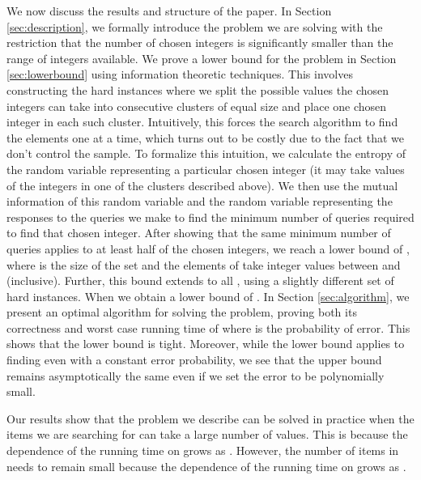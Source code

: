 \documentclass[12pt]{article}
\begin{document}
We now discuss the results and structure of the paper. In Section \ref{sec:description}, we formally introduce the problem we are solving with the restriction that the number of chosen integers is significantly smaller than the range of integers available. We prove a lower bound for the problem in Section \ref{sec:lowerbound} using information theoretic techniques. This involves constructing the hard instances where we split the possible values the chosen integers can take into consecutive clusters of equal size and place one chosen integer in each such cluster. Intuitively, this forces the search algorithm to find the elements one at a time, which turns out to be costly due to the fact that we don't control the sample. To formalize this intuition, we calculate the entropy of the random variable representing a particular chosen integer (it may take values of the integers in one of the clusters described above). We then use the mutual information of this random variable and the random variable representing the responses to the queries we make to find the minimum number of queries required to find that chosen integer. After showing that the same minimum number of queries applies to at least half of the chosen integers, we reach a lower bound of , where  is the size of the set  and the elements of   take integer values between  and  (inclusive). Further, this bound extends to all , using a slightly different set of hard instances. When  we obtain a lower bound of .  In Section \ref{sec:algorithm}, we present an optimal algorithm for solving the problem, proving both its correctness and worst case running time of  where  is the probability of error. This shows that the lower bound is tight. Moreover, while the lower bound applies to finding  even with a constant error probability, we see that the upper bound remains asymptotically the same even if we set the error  to be polynomially small.  

Our results show that the problem we describe can be solved in practice when the items we are searching for can take a large number of values. This is because the dependence of the running time on  grows as . However, the number of items in  needs to remain small because the dependence of the running time on  grows as . 
\end{document}
